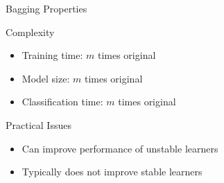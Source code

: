 \documentclass[14pt]{beamer}
\begin{document}
\begin{frame}{Bagging Properties}
	\begin{block}{Complexity}
		\begin{itemize}
			\pause
			\item Training time: \pause $m$ times original
			\pause
			\item Model size: \pause $m$ times original
			\pause
			\item Classification time: \pause $m$ times original
		\end{itemize}
	\end{block}
	\pause
	\begin{block}{Practical Issues}
		\begin{itemize}
			\item Can improve performance of unstable learners
			\item Typically does not improve stable learners
		\end{itemize}
	\end{block}
\end{frame}
\end{document}
